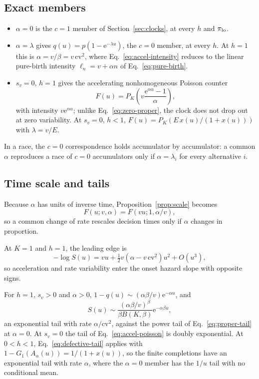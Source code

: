 \documentclass[12pt]{article}
\newcommand{\e}{\mathrm{e}}
\theoremstyle{definition}
\theoremstyle{plain}
\theoremstyle{remark}
\begin{document}
\subsection{Exact members}
\begin{itemize}
\item $\alpha=0$ is the $c=1$ member of Section~\ref{sec:clocks}, at every $h$ and $\pi_{\rm lo}$.
\item $\alpha=\lambda$ gives $q(u)=p(1-\e^{-\lambda u})$, the $c=0$ member, at every $h$. At $h=1$ this is $\alpha=v/\beta=v\,\mathrm{cv}^2$, where Eq.~\eqref{eq:accel-intensity} reduces to the linear pure-birth intensity $\ell_n=v+\alpha n$ of Eq.~\eqref{eq:pure-birth}.
\item $s_v=0$, $h=1$ gives the accelerating nonhomogeneous Poisson counter
\begin{equation}
 F(u)=P_K\!\left(v\frac{\e^{\alpha u}-1}{\alpha}\right),\label{eq:accel-poisson}
\end{equation}
with intensity $v\e^{\alpha u}$; unlike Eq.~\eqref{eq:zero-proper}, the clock does not drop out at zero variability. At $s_v=0$, $h<1$, $F(u)=P_K(E\,x(u)/(1+x(u)))$ with $\lambda=v/E$.
\end{itemize}
In a race, the $c=0$ correspondence holds accumulator by accumulator: a common $\alpha$ reproduces a race of $c=0$ accumulators only if $\alpha=\lambda_i$ for every alternative $i$.

\subsection{Time scale and tails}
Because $\alpha$ has units of inverse time, Proposition~\ref{prop:scale} becomes
\begin{equation}
 F(u;v,\alpha)=F(vu;1,\alpha/v),\label{eq:accel-scale}
\end{equation}
so a common change of rate rescales decision times only if $\alpha$ changes in proportion.

At $K=1$ and $h=1$, the leading edge is
\begin{equation}
 -\log S(u)=vu+\tfrac12 v\left(\alpha-v\,\mathrm{cv}^2\right)u^2+O(u^3),\label{eq:accel-onset}
\end{equation}
so acceleration and rate variability enter the onset hazard slope with opposite signs.

For $h=1$, $s_v>0$ and $\alpha>0$, $1-q(u)\sim(\alpha\beta/v)\e^{-\alpha u}$, and
\begin{equation}
 S(u)\sim\frac{(\alpha\beta/v)^\beta}{\beta B(K,\beta)}\e^{-\alpha\beta u},\label{eq:accel-tail}
\end{equation}
an exponential tail with rate $\alpha/\mathrm{cv}^2$, against the power tail of Eq.~\eqref{eq:proper-tail} at $\alpha=0$. At $s_v=0$ the tail of Eq.~\eqref{eq:accel-poisson} is doubly exponential. At $0<h<1$, Eq.~\eqref{eq:defective-tail} applies with $1-G_1(A_\alpha(u))=1/(1+x(u))$, so the finite completions have an exponential tail with rate $\alpha$, where the $\alpha=0$ member has the $1/u$ tail with no conditional mean.
\end{document}
